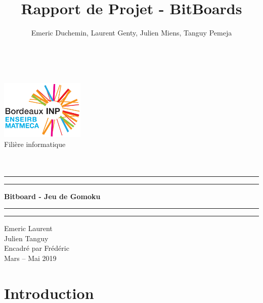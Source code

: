 \documentclass[a4paper,11pt]{article}
\author{Emeric Duchemin, Laurent Genty, Julien Miens, Tanguy Pemeja}
\title{Rapport de Projet - BitBoards}
\begin{document}
\thispagestyle{empty}
~
\vfill
\begin{center}
    \includegraphics[width=0.3\textwidth]{logo}\\[0.5cm]

    \LARGE Filière informatique\\
    \LARGE {}\\[1.5cm]
    {\Large \bfseries {}}\\[0.5cm]
    \scshape
	\vspace*{\baselineskip}
	\rule{\textwidth}{1.6pt}\vspace*{-\baselineskip}\vspace*{2pt}
	\rule{\textwidth}{0.4pt}
	\vspace{0.\baselineskip}

    {\LARGE \textbf{Bitboard - Jeu de Gomoku}}
	\vspace{0.65\baselineskip}

	\rule{\textwidth}{0.4pt}\vspace*{-\baselineskip}\vspace{3.2pt}
	\rule{\textwidth}{1.6pt}
    {\Large Emeric  \quad Laurent  \\\quad Julien  \quad Tanguy }\\[0.5cm]
    {\large Encadré par Frédéric }\\
    \vfill
    {\large Mars -- Mai 2019}
    \vfill
    ~
\end{center}
\newpage

\tableofcontents
\listoffigures

\newpage


\section*{Introduction}
\end{document}
